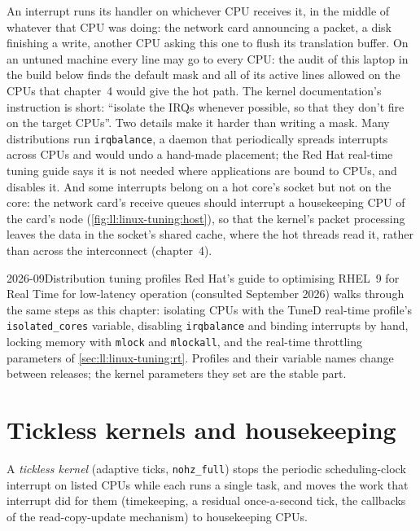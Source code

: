 An interrupt runs its handler on whichever CPU receives it, in the middle of whatever that CPU was doing: the network card
announcing a packet, a disk finishing a write, another CPU asking this one to flush its translation buffer. On an untuned
machine every line may go to every CPU: the audit of this laptop in the build below finds the default mask and all of its
active lines allowed on the CPUs that chapter~4 would give the hot path. The kernel documentation's instruction is short:
``isolate the IRQs whenever possible, so that they don't fire on the target CPUs''. Two details make it harder than writing a
mask. Many distributions run \texttt{irqbalance}, a daemon that periodically spreads interrupts across CPUs and would undo a
hand-made placement; the Red Hat real-time tuning guide says it is not needed where applications are bound to CPUs, and
disables it. And some interrupts belong on a hot core's socket but not on the core: the network card's receive queues should
interrupt a housekeeping CPU of the card's node (\cref{fig:ll:linux-tuning:host}), so that the kernel's packet processing
leaves the data in the socket's shared cache, where the hot threads read it, rather than across the interconnect
(chapter~4).

\begin{dated}{2026-09}{Distribution tuning profiles}\label{dat:ll:linux-tuning:rhel}
Red Hat's guide to optimising RHEL~9 for Real Time for low-latency operation (consulted September 2026) walks through the
same steps as this chapter: isolating CPUs with the TuneD real-time profile's \texttt{isolated\_cores} variable, disabling
\texttt{irqbalance} and binding interrupts by hand, locking memory with \texttt{mlock} and \texttt{mlockall}, and the
real-time throttling parameters of \cref{sec:ll:linux-tuning:rt}. Profiles and their variable names change between releases;
the kernel parameters they set are the stable part.
\end{dated}

\section{Tickless kernels and housekeeping}

\begin{definition}\label{def:ll:linux-tuning:nohz}
A \emph{tickless kernel} (adaptive ticks, \texttt{nohz\_full}) stops the periodic scheduling-clock
interrupt on listed CPUs while each runs a single task, and moves the work that interrupt did for them (timekeeping, a residual
once-a-second tick, the callbacks of the read-copy-update mechanism) to housekeeping CPUs.
\end{definition}

